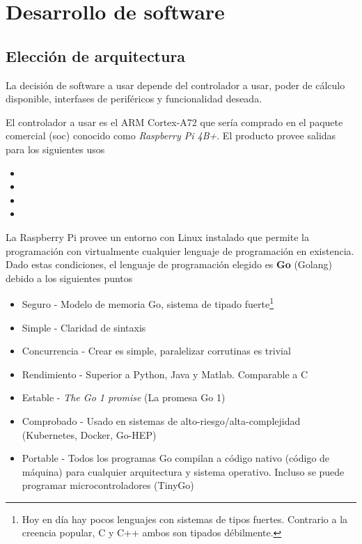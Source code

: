 \section{Desarrollo de software}

\subsection{Elección de arquitectura}
La decisión de software a usar depende del controlador a usar, poder de cálculo disponible, interfases de periféricos y funcionalidad deseada.

El controlador a usar es el ARM Cortex-A72 que sería comprado en el paquete comercial (\gls{soc}) conocido como \textit{Raspberry Pi 4B+}. El producto provee salidas para los siguientes usos

\begin{itemize}
    \item {}
    \item {}
    \item {}
    \item {}
\end{itemize}

La Raspberry Pi provee un entorno con Linux instalado que permite la programación con virtualmente cualquier lenguaje de programación en existencia. Dado estas condiciones, el lenguaje de programación elegido es \textbf{Go} (Golang) debido a los siguientes puntos

\begin{itemize}
    \item Seguro - Modelo de memoria Go, sistema de tipado fuerte\footnote{Hoy en día hay pocos lenguajes con sistemas de tipos fuertes. Contrario a la creencia popular, C y C++ ambos son tipados débilmente.}
    \item Simple - Claridad de sintaxis
    \item Concurrencia - Crear  es simple, paralelizar corrutinas es trivial
    \item Rendimiento - Superior a Python, Java y Matlab. Comparable a C
    \item Estable - \textit{The Go 1 promise} (La promesa Go 1)
    \item Comprobado -  Usado en sistemas de alto-riesgo/alta-complejidad (Kubernetes, Docker, Go-HEP)
    \item Portable - Todos los programas Go compilan a código nativo (código de máquina) para cualquier arquitectura y sistema operativo. Incluso se puede programar microcontroladores (TinyGo)
\end{itemize}


